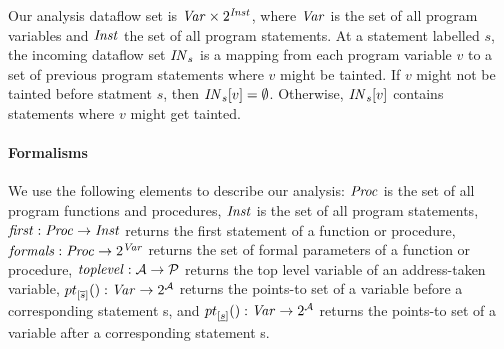 Our analysis dataflow set is $\mathit{Var} \times 2^{\mathit{Inst}}$,
where $\mathit{Var}$ is the set of all program variables and
$\mathit{Inst}$ the set of all program statements. 
At a statement labelled $s$, the incoming dataflow set $\mathit{IN}_s$
is a mapping from each program variable $v$ to a set of
previous program statements where $v$ might be tainted.
If $v$ might not be tainted before statment $s$, then
$\mathit{IN}_s[v] = \emptyset$. Otherwise, $\mathit{IN}_s[v]$
contains statements where $v$ might get tainted.

\paragraph{Formalisms}
We use the following elements to describe our analysis:
$\mathit{Proc}$ is the set of all program functions and procedures,
$\mathit{Inst}$ is the set of all program statements,
$\mathit{first}{}: \mathit{Proc} \rightarrow \mathit{Inst}$ returns the first
statement of a function or procedure,
$\mathit{formals}{}: \mathit{Proc} \rightarrow 2^{\mathit{Var}}$ returns the
set of formal parameters of a function or procedure, 
$\mathit{toplevel}{}: \mathcal{A} \rightarrow \mathcal{P}$ returns the top level
variable of an address-taken variable,
${pt}_{[\overline{s}] }(): \mathit{Var} \rightarrow 2^{\mathcal{A}}$ returns the
points-to set of a variable before a corresponding statement s,
and ${pt}_{[\underline{s}]}(): \mathit{Var} \rightarrow 2^{\mathcal{A}}$ returns the
points-to set of a variable after a corresponding statement s.

